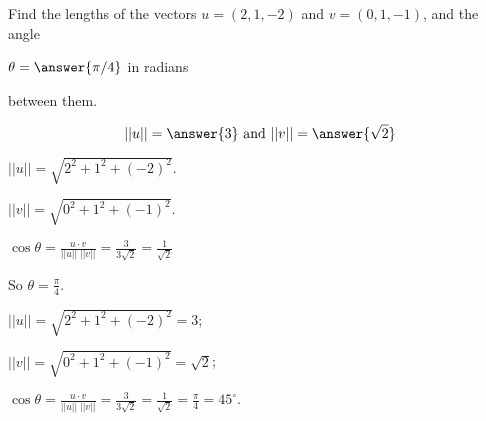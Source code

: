 \documentclass{ximera}
\begin{document}
\begin{exercise} \label{c1.4.3}
Find the lengths of the vectors $u=(2,1,-2)$ and $v=(0,1,-1)$,
and the angle \begin{prompt}$\theta = \answer{\pi/4}$ in radians\end{prompt} between them.
\begin{prompt}
  \[
    ||u|| = \answer{3} \mbox{ and } ||v|| = \answer{\sqrt{2}}
  \]
\end{prompt}
\begin{hint}
  $||u||  =  \sqrt{2^2 + 1^2 + (-2)^2}$.
\end{hint}
\begin{hint}
$||v||  =  \sqrt{0^2 + 1^2 + (-1)^2}$.
\end{hint}
\begin{hint}
$\cos \theta = \frac{u \cdot v}{||u||\;||v||}  =  \frac{3}{3\sqrt{2}} =
\frac{1}{\sqrt{2}}$
\end{hint}
\begin{hint}
So $\theta = \frac{\pi}{4}$.
\end{hint}

\begin{solution}

$||u||  =  \sqrt{2^2 + 1^2 + (-2)^2}  =  3$;

$||v||  =  \sqrt{0^2 + 1^2 + (-1)^2}  =  \sqrt{2}$;

$
\cos \theta = \frac{u \cdot v}{||u||\;||v||}  =  \frac{3}{3\sqrt{2}} =
\frac{1}{\sqrt{2}} = \frac{\pi}{4} = 45^\circ.
$

\end{solution}
\end{exercise}
\end{document}
